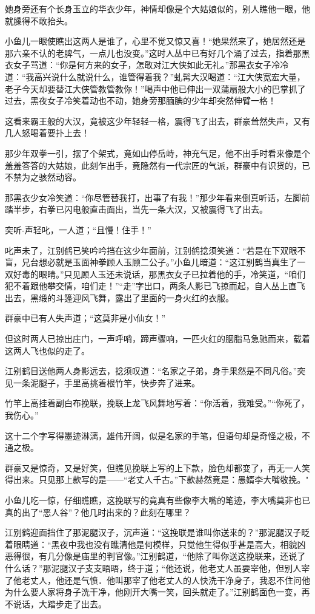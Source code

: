 \documentclass[12pt,oneside]{book}
\begin{document}
她身旁还有个长身玉立的华衣少年，神情却像是个大姑娘似的，别人瞧他一眼，他就臊得不敢抬头。

小鱼儿一眼使瞧出这两人是谁了，心里不觉又惊又喜！``她果然来了，她居然还是那六亲不认的老脾气，一点儿也没变。''这时人丛中已有好几个涌了过去，指着那黑衣女子骂道：``你是何方来的女子，怎敢对江大侠如此无礼。''那黑衣女子冷冷道：``我高兴说什么就说什么，谁管得着我？''虬髯大汉喝道：``江大侠宽宏大量，老子今天却要替江大侠管教管教你！''喝声中他已伸出一双蒲扇般大小的巴掌抓了过去，黑夜女子冷笑着动也不动，她身旁那腼腆的少年却突然伸臂一格！

这看来霸王般的大汉，竟被这少年轻轻一格，震得飞了出去，群豪耸然失声，又有几人怒喝着要扑上去！

那少年双拳一引，摆了个架式，竟如山停岳峙，神充气足，他不出手时看来像是个羞羞答答的大姑娘，此刻乍出手，竟隐然有一代宗匠的气派，群豪中有识货的，已不禁为之骇然动容。

那黑衣少女冷笑道：``你尽管替我打，出事了有我！''那少年看来倒真听话，左脚前踏半步，右拳已闪电般直击面出，当先一条大汉，又被震得飞了出去。

突听-声轻叱，一人道；``且慢！住手！''

叱声未了，江别鹤已笑吟吟挡在这少年面前，江别鹤捻须笑道：``若是在下双眼不盲，兄台想必就是玉面神拳顾人玉顾二公子。''小鱼儿暗道：``这江别鹤当真生了一双好毒的眼睛。''只见顾人玉还未说话，那黑衣女子已拉着他的手，冷笑道，``咱们犯不着跟他攀交情，咱们走！''``走''字出口，两条人影已飞掠而起，自人丛上直飞出去，黑缎的斗篷迎风飞舞，露出了里面的一身火红的衣服。

群豪中已有人失声道；``这莫非是小仙女！''

但这时两人已掠出庄门，一声呼哨，蹄声骤响，一匹火红的胭脂马急驰而来，载着这两人飞也似的走了。

江别鹤目送他两人身影远去，捻须叹道：``名家之子弟，身手果然是不同凡俗。''突见一条泥腿子，手里高挑着根竹竿，快步奔了进来。

竹竿上高挂着副白布挽联，挽联上龙飞风舞地写着：``你活着，我难受。''``你死了，我伤心。''

这十二个字写得墨迹淋漓，雄伟开阔，似是名家的手笔，但语句却是奇怪之极，不通之极。

群豪又是惊奇，又是好笑，但瞧见挽联上写的上下款，脸色却都变了，再无一人笑得出来。只见那上款写的是------``老丈人千古。''下款赫然竟是：愚婿李大嘴敬挽。"

小鱼儿吃一惊，仔细瞧瞧，这挽联写的竟真有些像李大嘴的笔迹，李大嘴莫非也已真的出了``恶人谷''？他几时出来的？此刻在哪里？

江别鹤迎面挡住了那泥腿汉子，沉声道：``这挽联是谁叫你送来的？''那泥腿汉子眨着眼睛道：``黑夜中我也没有瞧清他是何模样，只觉他生得似乎甚是高大，相貌凶恶得很，有几分像是庙里的判官像。''江别鹤道，``他除了叫你送这挽联来，还说了什么话？''那泥腿汉子支支晤晤，终于道；``他还说，他老丈人虽要宰他，但别人宰了他老丈人，他还是气愤．他叫那宰了他老丈人的人快洗干净身子，我忍不住问他为什么要人家将身子洗干净，他刚开大嘴一笑，回头就走了。''江别鹤面色一变，再不说话，大踏步走了出去。
\end{document}
